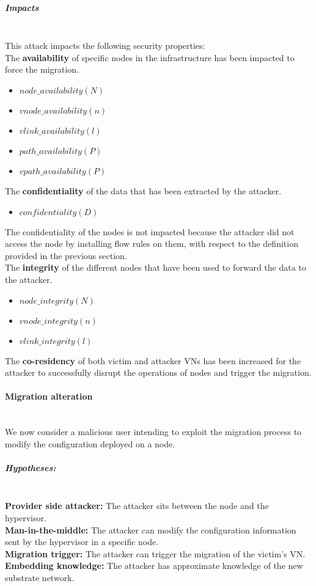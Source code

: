 \subparagraph{Impacts}\textbf{\\}
This attack impacts the following security properties:\\
The \textbf{availability} of specific nodes in the infrastructure has been impacted to force the migration.
\begin{itemize}
    \item $node\_availability(N)$
    \item $vnode\_availability(n)$
    \item $vlink\_availability(l)$
    \item $path\_availability(P)$
    \item $vpath\_availability(P)$
\end{itemize}
The \textbf{confidentiality} of the data that has been extracted by the attacker.\\
\begin{itemize}
    \item $confidentiality(D)$
\end{itemize}
The confidentiality of the nodes is not impacted because the attacker did not access the node by installing flow rules on them, with respect to the definition provided in the previous section.\\
The \textbf{integrity} of the different nodes that have been used to forward the data to the attacker.
    \begin{itemize}
    \item $node\_integrity(N)$
    \item $vnode\_integrity(n)$
    \item $vlink\_integrity(l)$
\end{itemize}
The \textbf{co-residency} of both victim and attacker VNs has been increased for the attacker to successfully disrupt the operations of nodes and trigger the migration.


\paragraph{Migration alteration}\textbf{\\}
We now consider a malicious user intending to exploit the migration process to modify the configuration deployed on a node.

\subparagraph{Hypotheses:}\textbf{\\}
\textbf{Provider side attacker:} The attacker sits between the node and the hypervisor.\\
\textbf{Man-in-the-middle:} The attacker can modify the configuration information sent by the hypervisor in a specific node.\\
\textbf{Migration trigger:} The attacker can trigger the migration of the victim's VN.\\
\textbf{Embedding knowledge:} The attacker has approximate knowledge of the new substrate network.\\

